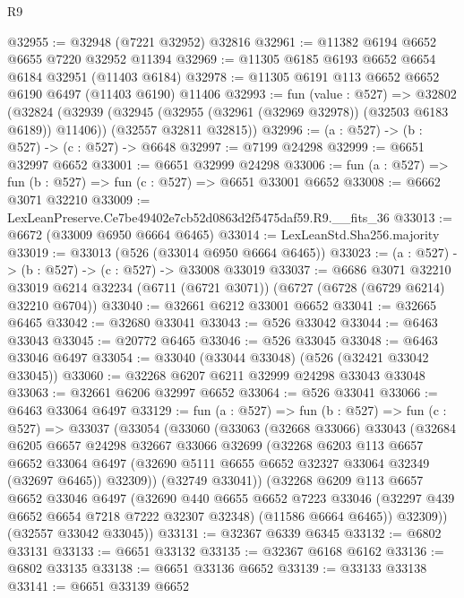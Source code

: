 \begin{lexlean}{R9}
\begin{coremodule}
@32955 := @32948 (@7221 @32952) @32816
@32961 := @11382 @6194 @6652 @6655 @7220 @32952 @11394
@32969 := @11305 @6185 @6193 @6652 @6654 @6184 @32951 (@11403 @6184)
@32978 := @11305 @6191 @113 @6652 @6652 @6190 @6497 (@11403 @6190) @11406
@32993 := fun (value : @527) =>
  @32802
    (@32824
      (@32939 (@32945 (@32955 (@32961 (@32969 @32978)) (@32503 @6183 @6189)) @11406))
      (@32557 @32811 @32815))
@32996 := (a : @527) -> (b : @527) -> (c : @527) -> @6648
@32997 := @7199 @24298
@32999 := @6651 @32997 @6652
@33001 := @6651 @32999 @24298
@33006 := fun (a : @527) => fun (b : @527) => fun (c : @527) => @6651 @33001 @6652
@33008 := @6662 @3071 @32210
@33009 := LexLeanPreserve.Ce7be49402e7cb52d0863d2f5475daf59.R9.__fits_36
@33013 := @6672 (@33009 @6950 @6664 @6465)
@33014 := LexLeanStd.Sha256.majority
@33019 := @33013 (@526 (@33014 @6950 @6664 @6465))
@33023 := (a : @527) -> (b : @527) -> (c : @527) -> @33008 @33019
@33037 := @6686
    @3071
    @32210
    @33019
    @6214
    @32234
    (@6711 (@6721 @3071))
    (@6727 (@6728 (@6729 @6214) @32210 @6704))
@33040 := @32661 @6212 @33001 @6652
@33041 := @32665 @6465
@33042 := @32680 @33041
@33043 := @526 @33042
@33044 := @6463 @33043
@33045 := @20772 @6465
@33046 := @526 @33045
@33048 := @6463 @33046 @6497
@33054 := @33040 (@33044 @33048) (@526 (@32421 @33042 @33045))
@33060 := @32268 @6207 @6211 @32999 @24298 @33043 @33048
@33063 := @32661 @6206 @32997 @6652
@33064 := @526 @33041
@33066 := @6463 @33064 @6497
@33129 := fun (a : @527) =>
  fun (b : @527) =>
  fun (c : @527) =>
  @33037
    (@33054
      (@33060
        (@33063
          (@32668 @33066)
          @33043
          (@32684
            @6205
            @6657
            @24298
            @32667
            @33066
            @32699
            (@32268
              @6203
              @113
              @6657
              @6652
              @33064
              @6497
              (@32690 @5111 @6655 @6652 @32327 @33064 @32349 (@32697 @6465))
              @32309))
          (@32749 @33041))
        (@32268
          @6209
          @113
          @6657
          @6652
          @33046
          @6497
          (@32690
            @440
            @6655
            @6652
            @7223
            @33046
            (@32297 @439 @6652 @6654 @7218 @7222 @32307 @32348)
            (@11586 @6664 @6465))
          @32309))
      (@32557 @33042 @33045))
@33131 := @32367 @6339 @6345
@33132 := @6802 @33131
@33133 := @6651 @33132
@33135 := @32367 @6168 @6162
@33136 := @6802 @33135
@33138 := @6651 @33136 @6652
@33139 := @33133 @33138
@33141 := @6651 @33139 @6652

\end{coremodule}
\end{lexlean}
